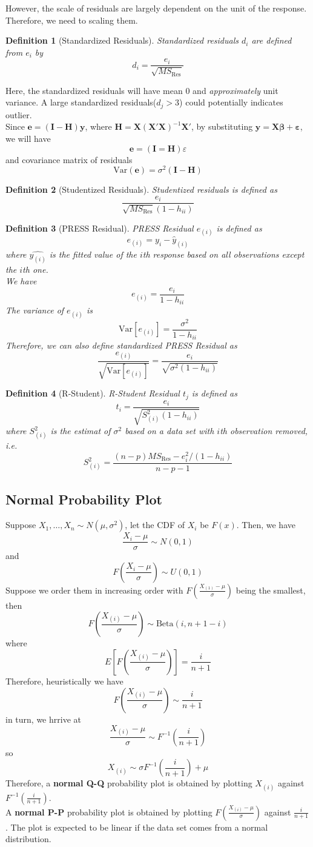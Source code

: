 \documentclass[11pt]{article}
\newcommand{\var}{\mathrm{Var}}
\newtheorem{definition}{Definition}[section]
\theoremstyle{definition}
\begin{document}
However, the scale of residuals are largely dependent on the unit of the response. Therefore, we need to scaling them.
\begin{definition}[Standardized Residuals]
\normalfont Standardized residuals $d_i$ are defined from $e_i$ by
\[
d_i=\frac{e_i}{\sqrt{MS_\text{Res}}}
\]
\end{definition}
Here, the standardized residuals will have mean $0$ and \textit{approximately} unit variance. A large standardized residuals($d_j>3$) could potentially indicates outlier.\\
Since $\bm{e}=(\bm{I}-\bm{H})\bm{y}$, where $\bm{H}=\bm{X}(\bm{X}'\bm{X})^{-1}\bm{X}'$, by substituting $\bm{y}=\bm{X\beta}+\bm{\varepsilon}$, we will have
\[
\bm{e}=(\bm{I}=\bm{H})\varepsilon
\]
and covariance matrix of residuals
\[
\var(\bm{e})=\sigma^2(\bm{I}-\bm{H})
\]
\begin{definition}[Studentized Residuals]
\normalfont Studentized residuals is defined as
\[
\frac{e_i}{\sqrt{MS_\text{Res}}(1-h_{ii})}
\]
\end{definition}
\begin{definition}[PRESS Residual]
\normalfont PRESS Residual $e_{(i)}$ is defined as
\[
e_{(i)}=y_i-\hat{y}_{(i)}
\]
where $\hat{y_{(i)}}$ is the fitted value of the $i$th response based on all observations except the $i$th one.\\
We have
\[
e_{(i)}=\frac{e_i}{1-h_{ii}}
\]
The variance of $e_{(i)}$ is
\[
\var[e_{(i)}]=\frac{\sigma^2}{1-h_{ii}}
\]
Therefore, we can also define standardized PRESS Residual as
\[
\frac{e_{(i)}}{\sqrt{\var[e_{(i)}]}}=\frac{e_i}{\sqrt{\sigma^2(1-h_{ii})}}
\]
\end{definition}
\begin{definition}[R-Student]
\normalfont R-Student Residual $t_j$ is defined as
\[
t_i=\frac{e_i}{\sqrt{S^2_{(i)}(1-h_{ii})}}
\]
where $S^2_{(i)}$ is the estimat of $\sigma^2$ based on a data set with $i$th observation removed, i.e.
\[
S^2_{(i)}=\frac{(n-p)MS_\text{Res}-e_i^2/(1-h_{ii})}{n-p-1}
\]
\end{definition}
\subsection{Normal Probability Plot}
Suppose $X_1,\ldots, X_n\sim N(\mu, \sigma^2)$, let the CDF of $X_i$ be $F(x)$. Then, we have
\[
\frac{X_i-\mu}{\sigma}\sim N(0,1)
\]
and 
\[
F(\frac{X_i-\mu}{\sigma})\sim U(0,1)
\]
Suppose we order them in increasing order with $F(\frac{X_{(1)}-\mu}{\sigma})$ being the smallest, then
\[
F(\frac{X_{(i)}-\mu}{\sigma})\sim \text{Beta}(i, n+1-i)
\]
where
\[
E[F(\frac{X_{(i)}-\mu}{\sigma})]=\frac{i}{n+1}
\]
Therefore, heuristically we have
\[
F(\frac{X_{(i)}-\mu}{\sigma})\sim \frac{i}{n+1}
\]
in turn, we hrrive at
\[
\frac{X_{(i)}-\mu}{\sigma}\sim F^{-1}(\frac{i}{n+1})
\]
so
\[
X_{(i)}\sim \sigma F^{-1}(\frac{i}{n+1})+\mu
\]
Therefore, a \textbf{normal Q-Q} probability plot is obtained by plotting $X_{(i)}$ against $F^{-1}(\frac{i}{n+1})$.\\
A \textbf{normal P-P} probability plot is obtained by plotting $F(\frac{X_{(i)}-\mu}{\sigma})$ against $\frac{i}{n+1}$.
The plot is expected to be linear if the data set comes from a normal distribution.
\end{document}
